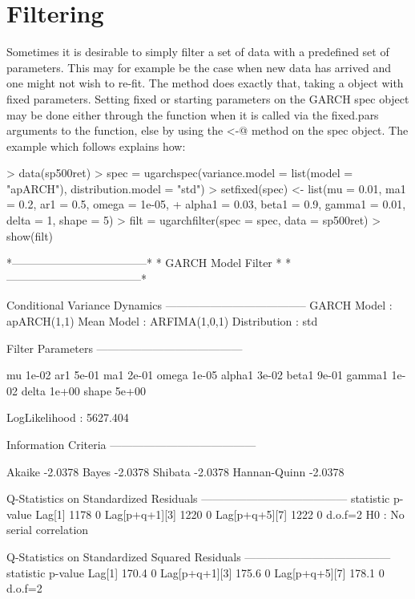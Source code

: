 \section{Filtering}\label{section:filtering}
Sometimes it is desirable to simply filter a set of data with a predefined set
of parameters. This may for example be the case when new data has arrived and
one might not wish to re-fit. The \verb@ugarchfilter@ method does exactly that,
taking a \verb@uGARCHspec@ object with fixed parameters. Setting fixed or
starting parameters on the GARCH spec object may be done either through the
\verb@ugarchspec@ function when it is called via the fixed.pars arguments to the
function, else by using the \verb@setfixed<-@ method on the spec object.
The example which follows explains how:
\begin{Schunk}
\begin{Sinput}
> data(sp500ret)
> spec = ugarchspec(variance.model = list(model = "apARCH"), distribution.model = "std")
> setfixed(spec) <- list(mu = 0.01, ma1 = 0.2, ar1 = 0.5, omega = 1e-05,
+     alpha1 = 0.03, beta1 = 0.9, gamma1 = 0.01, delta = 1, shape = 5)
> filt = ugarchfilter(spec = spec, data = sp500ret)
> show(filt)
\end{Sinput}
\begin{Soutput}
*------------------------------------*
*          GARCH Model Filter        *
*------------------------------------*

Conditional Variance Dynamics 	
--------------------------------------
GARCH Model	: apARCH(1,1)
Mean Model	: ARFIMA(1,0,1)
Distribution	: std

Filter Parameters
---------------------------------------

mu     1e-02
ar1    5e-01
ma1    2e-01
omega  1e-05
alpha1 3e-02
beta1  9e-01
gamma1 1e-02
delta  1e+00
shape  5e+00

LogLikelihood : 5627.404

Information Criteria
---------------------------------------

Akaike       -2.0378
Bayes        -2.0378
Shibata      -2.0378
Hannan-Quinn -2.0378

Q-Statistics on Standardized Residuals
---------------------------------------
              statistic p-value
Lag[1]             1178       0
Lag[p+q+1][3]      1220       0
Lag[p+q+5][7]      1222       0
d.o.f=2
H0 : No serial correlation

Q-Statistics on Standardized Squared Residuals
---------------------------------------
              statistic p-value
Lag[1]            170.4       0
Lag[p+q+1][3]     175.6       0
Lag[p+q+5][7]     178.1       0
d.o.f=2


\end{Soutput}
\end{Schunk}
